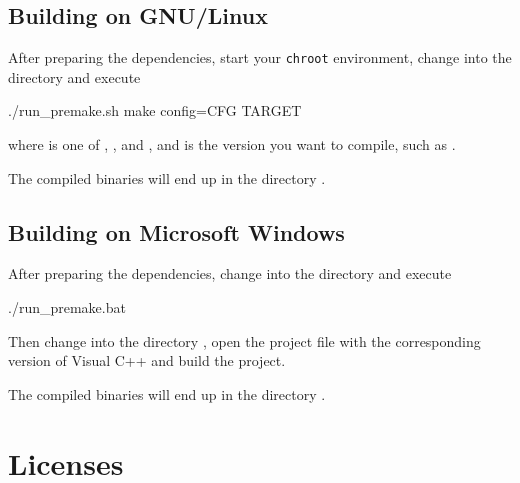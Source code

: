 \section{Building on GNU/Linux}

After preparing the dependencies, start your \texttt{chroot}
environment, change into the directory  and execute

\begin{VerbatimBoth}
  ./run_premake.sh
  make config=CFG TARGET
\end{VerbatimBoth}

where  is one of ,
,  and
, and  is the version you
want to compile, such as .

The compiled binaries will end up in the directory .

\section{Building on Microsoft Windows}

After preparing the dependencies, change into the directory
 and execute

\begin{VerbatimBoth}
  ./run_premake.bat
\end{VerbatimBoth}

Then change into the directory , open the
project file with the corresponding version of Visual C++ and build
the project.

The compiled binaries will end up in the directory .

\chapter{Licenses}

\scriptsize

\normalsize

\scriptsize

\normalsize




